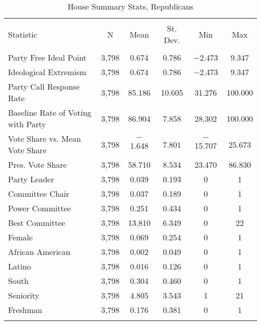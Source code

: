 \documentclass[12pt]{article}
\begin{document}
\begin{table}[H] 
	\centering 
	\singlespacing
	\caption{House Summary Stats, Republicans} 
	\label{} 
	\begin{tabular}{@{\extracolsep{5pt}}lccccc} 
		\\[-1.8ex]\hline 
		\hline \\[-1.8ex] 
		Statistic & \multicolumn{1}{c}{N} & \multicolumn{1}{c}{Mean} & \multicolumn{1}{c}{St. Dev.} & \multicolumn{1}{c}{Min} & \multicolumn{1}{c}{Max} \\ 
		\hline \\[-1.8ex] 
		Party Free Ideal Point & 3,798 & 0.674 & 0.786 & $-$2.473 & 9.347 \\ 
		Ideological Extremism & 3,798 & 0.674 & 0.786 & $-$2.473 & 9.347 \\ 	
		Party Call Response Rate & 3,798 & 85.186 & 10.605 & 31.276 & 100.000 \\ 
		Baseline Rate of Voting with Party & 3,798 & 86.904 & 7.858 & 28.302 & 100.000 \\
		Vote Share vs. Mean Vote Share & 3,798 & $-$1.648 & 7.801 & $-$15.707 & 25.673 \\
		Pres. Vote Share & 3,798 & 58.710 & 8.534 & 23.470 & 86.830 \\
		Party Leader & 3,798 & 0.039 & 0.193 & 0 & 1 \\ 
		Committee Chair & 3,798 & 0.037 & 0.189 & 0 & 1 \\ 
		Power Committee & 3,798 & 0.251 & 0.434 & 0 & 1 \\ 
		Best Committee & 3,798 & 13.810 & 6.349 & 0 & 22 \\ 
		Female & 3,798 & 0.069 & 0.254 & 0 & 1 \\ 
		African American & 3,798 & 0.002 & 0.049 & 0 & 1 \\ 
		Latino & 3,798 & 0.016 & 0.126 & 0 & 1 \\ 
		South & 3,798 & 0.304 & 0.460 & 0 & 1 \\
		Seniority & 3,798 & 4.805 & 3.543 & 1 & 21 \\  
		Freshman & 3,798 & 0.176 & 0.381 & 0 & 1 \\		 
		\hline \\[-1.8ex] 
	\end{tabular} 
\end{table} 
\end{document}
